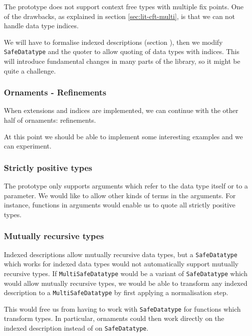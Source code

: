 The prototype does not support context free types with multiple fix
points.
One of the drawbacks, as explained in section \ref{sec:lit-cft-multi},
is that we can not handle data type indices.

We will have to formalise indexed descriptions (section
), then we modify \texttt{SafeDatatype} and the quoter to
allow quoting of data types with indices.
This will introduce fundamental changes in many parts of the library,
so it might be quite a challenge.

\subsubsection{Ornaments - Refinements}\label{sec:plan-refinements}

When extensions and indices are implemented, we can continue with the
other half of ornaments: refinements. 

At this point we should be able to implement some interesting examples
and we can experiment.

\subsubsection{Strictly positive types}\label{sec:plan-spt}

The prototype only supports arguments which refer to the data type
itself or to a parameter.
We would like to allow other kinds of terms in the arguments.
For instance, functions in arguments would enable us to quote all
strictly positive types.

\subsubsection{Mutually recursive types}\label{sec:plan-mutual}

Indexed descriptions allow mutually recursive data types, but
a \texttt{SafeDatatype} which works for indexed data types would not
automatically support mutually recursive types.
If \texttt{MultiSafeDatatype} would be a variant of
\texttt{SafeDatatype} which would allow mutually recursive types, we
would be able to transform any indexed description to a
\texttt{MultiSafeDatatype} by first applying a normalisation step.

This would free us from having to work with \texttt{SafeDatatype} for
functions which transform types.
In particular, ornaments could then work directly on the indexed
description instead of on \texttt{SafeDatatype}.

